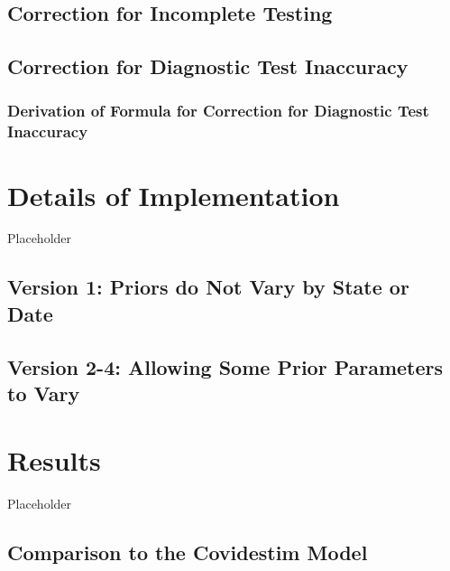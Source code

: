 \documentclass[12pt,twoside]{smiththesis}
\begin{document}
\hypertarget{correction-for-incomplete-testing}{%
\section{Correction for Incomplete Testing}\label{correction-for-incomplete-testing}}

\hypertarget{correct-test-inaccuracy}{%
\section{Correction for Diagnostic Test Inaccuracy}\label{correct-test-inaccuracy}}

\hypertarget{derivation-of-formula-for-correction-for-diagnostic-test-inaccuracy}{%
\subsection{Derivation of Formula for Correction for Diagnostic Test Inaccuracy}\label{derivation-of-formula-for-correction-for-diagnostic-test-inaccuracy}}

\hypertarget{details-of-implementation}{%
\chapter{Details of Implementation}\label{details-of-implementation}}

Placeholder

\hypertarget{version-1-priors-do-not-vary-by-state-or-date}{%
\section{Version 1: Priors do Not Vary by State or Date}\label{version-1-priors-do-not-vary-by-state-or-date}}

\hypertarget{version-2-4-allowing-some-prior-parameters-to-vary}{%
\section{Version 2-4: Allowing Some Prior Parameters to Vary}\label{version-2-4-allowing-some-prior-parameters-to-vary}}

\hypertarget{res}{%
\chapter{Results}\label{res}}

Placeholder

\hypertarget{comparison-to-the-covidestim-model}{%
\section{Comparison to the Covidestim Model}\label{comparison-to-the-covidestim-model}}
\end{document}
